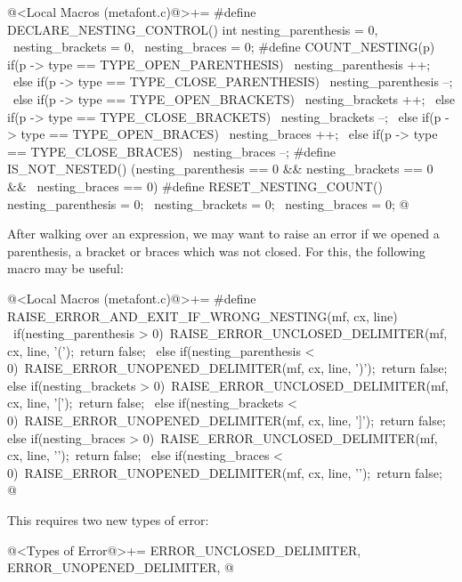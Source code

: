 \iniciocodigo
@<Local Macros (metafont.c)@>+=
#define DECLARE_NESTING_CONTROL() int nesting_parenthesis = 0, \
                                      nesting_brackets = 0, \
                                      nesting_braces = 0;
#define COUNT_NESTING(p) {if(p -> type == TYPE_OPEN_PARENTHESIS)           \
                               nesting_parenthesis ++;                    \
                             else if(p -> type == TYPE_CLOSE_PARENTHESIS) \
                               nesting_parenthesis --;                    \
                             else if(p -> type == TYPE_OPEN_BRACKETS)     \
                               nesting_brackets ++;                       \
                             else if(p -> type == TYPE_CLOSE_BRACKETS)    \
                               nesting_brackets --;                       \
                             else if(p -> type == TYPE_OPEN_BRACES)       \
                               nesting_braces ++;                         \
                             else if(p -> type == TYPE_CLOSE_BRACES)      \
                               nesting_braces --;}
#define IS_NOT_NESTED() (nesting_parenthesis == 0 && nesting_brackets == 0 && \
                         nesting_braces == 0)
#define RESET_NESTING_COUNT() nesting_parenthesis = 0; \
                              nesting_brackets = 0; \
                              nesting_braces = 0;
@
\fimcodigo

After walking over an expression, we may want to raise an error if we
opened a parenthesis, a bracket or braces which was not closed. For
this, the following macro may be useful:

\iniciocodigo
@<Local Macros (metafont.c)@>+=
#define RAISE_ERROR_AND_EXIT_IF_WRONG_NESTING(mf, cx, line) {\
  if(nesting_parenthesis > 0){\
    RAISE_ERROR_UNCLOSED_DELIMITER(mf, cx, line, '(');\
    return false;\
  } else if(nesting_parenthesis < 0){\
    RAISE_ERROR_UNOPENED_DELIMITER(mf, cx, line, ')');\
    return false;\
  } else if(nesting_brackets > 0){\
    RAISE_ERROR_UNCLOSED_DELIMITER(mf, cx, line, '[');\
    return false;\
  } else if(nesting_brackets < 0){\
    RAISE_ERROR_UNOPENED_DELIMITER(mf, cx, line, ']');\
    return false;\
  } else if(nesting_braces > 0){\
    RAISE_ERROR_UNCLOSED_DELIMITER(mf, cx, line, '{');\
    return false;\
  } else if(nesting_braces < 0){\
    RAISE_ERROR_UNOPENED_DELIMITER(mf, cx, line, '}');\
    return false;}}
@
\fimcodigo

This requires two new types of error:

\iniciocodigo
@<Types of Error@>+=
ERROR_UNCLOSED_DELIMITER, ERROR_UNOPENED_DELIMITER,
@
\fimcodigo

